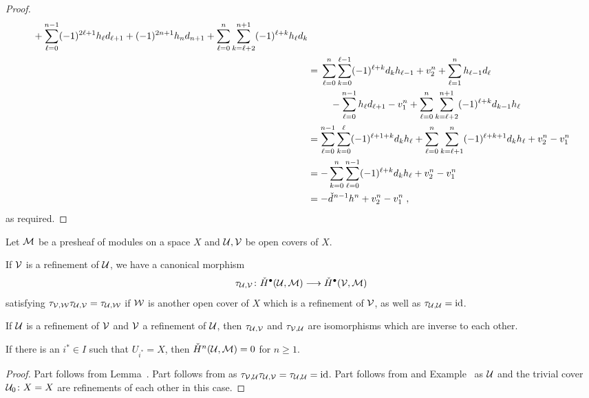 \documentclass[a4paper,parskip=half,numbers=enddot, DIV=12]{scrreprt}
\begin{document}
\begin{proof}
\begin{align*}
\begin{multlined}[t]
			+\sum_{\ell=0}^{n-1}(-1)^{2\ell+1}h_\ell d_{\ell+1}+(-1)^{2n+1}h_nd_{n+1}+\sum_{\ell=0}^{n}\sum_{k=\ell+2}^{n+1}(-1)^{\ell+k}h_\ell d_k
		\end{multlined}\\
		&=\begin{multlined}[t]
			\sum_{\ell=0}^{n}\sum_{k=0}^{\ell-1}(-1)^{\ell+k}d_k h_{\ell-1}+v_2^n+\sum_{\ell=1}^{n}h_{\ell-1} d_\ell\\
			-\sum_{\ell=0}^{n-1}h_\ell d_{\ell+1}-v_1^n+\sum_{\ell=0}^{n}\sum_{k=\ell+2}^{n+1}(-1)^{\ell+k}d_{k-1} h_{\ell}
		\end{multlined}\\
		&=\sum_{\ell=0}^{n-1}\sum_{k=0}^{\ell}(-1)^{\ell+1+k}d_k h_{\ell}+\sum_{\ell=0}^{n}\sum_{k=\ell+1}^{n}(-1)^{\ell+k+1}d_{k} h_{\ell}+v_2^n-v_1^n\\
		&=-\sum_{k=0}^{n}\sum_{\ell=0}^{n-1}(-1)^{\ell+k}d_kh_\ell +v_2^n-v_1^n\\
		&=-\hacek{d}^{n-1}h^n+v_2^n-v_1^n\;,
	\end{align*}
	as required.
\end{proof}
\begin{cor}
	Let $\mathcal{M}$ be a presheaf of modules on a space $X$ and $\mathcal{U},\mathcal{V}$ be open covers of $X$.
	\begin{alphanumerate} 
		\item If $\mathcal{V}$ is a refinement of $\mathcal{U}$, we have a canonical morphism 
		\begin{align*}
			\tau_{\Uu,\Vv}\colon \check{H}^\bullet (\Uu,\Mm)\morphism\check{H}^\bullet (\Vv,\Mm)
		\end{align*}
		satisfying $\tau_{\mathcal{V},\mathcal{W}}\tau_{\mathcal{U},\mathcal{V}}=\tau_{\mathcal{U},\mathcal{W}}$ if $\mathcal{W}$ is another open cover of $X$ which is a refinement of $\mathcal{V}$, as well as $\tau_{\mathcal{U},\mathcal{U}}=\operatorname{id}$.
		\item If $\mathcal{U}$ is a refinement of $\mathcal{V}$ and $\mathcal{V}$ a refinement of $\mathcal{U}$, then $\tau_{\mathcal{U},\mathcal{V}}$ and $\tau_{\mathcal{V},\mathcal{U}}$ are isomorphisms which are inverse to each other.
		\item If there is an $i^*\in I$ such that $U_{i^*}=X$, then $\check{H}^n(\mathcal{U},\mathcal{M})=0$ for $n\geq 1$.
	\end{alphanumerate}
\end{cor}
\begin{proof}
	Part  follows from Lemma~. Part  follows from  as $\tau_{\mathcal{V},\mathcal{U}}\tau_{\mathcal{U},\mathcal{V}}=\tau_{\mathcal{U},\mathcal{U}}=\operatorname{id}$. Part  follows from  and Example~ as $\mathcal{U}$ and the trivial cover $\mathcal{U}_0\colon X=X$ are refinements of each other in this case.
\end{proof}
\end{document}
